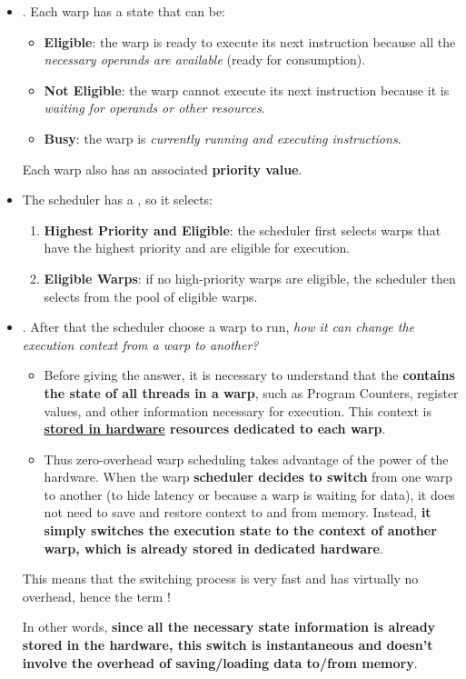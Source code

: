 \begin{itemize}
    \item {}. Each warp has a state that can be:
    \begin{itemize}
        \item \textbf{Eligible}: the warp is ready to execute its next instruction because all the \emph{necessary operands are available} (ready for consumption).
        \item \textbf{Not Eligible}: the warp cannot execute its next instruction because it is \emph{waiting for operands or other resources}.
        \item \textbf{Busy}: the warp is \emph{currently running and executing instructions}.
    \end{itemize}
    Each warp also has an associated \textbf{priority value}.

    \item The scheduler has a , so it selects:
    \begin{enumerate}
        \item \textbf{Highest Priority and Eligible}: the scheduler first selects warps that have the highest priority and are eligible for execution.
        \item \textbf{Eligible Warps}: if no high-priority warps are eligible, the scheduler then selects from the pool of eligible warps.
    \end{enumerate}

    \item {}. After that the scheduler choose a warp to run, \emph{how it can change the execution context from a warp to another?}
    \begin{itemize}
        \item Before giving the answer, it is necessary to understand that the  \textbf{contains the state of all threads in a warp}, such as Program Counters, register values, and other information necessary for execution. This context is \textbf{\underline{stored in hardware} resources dedicated to each warp}.
        
        \item Thus zero-overhead warp scheduling takes advantage of the power of the hardware. When the warp \textbf{scheduler decides to switch} from one warp to another (to hide latency or because a warp is waiting for data), it does not need to save and restore context to and from memory. Instead, \textbf{it simply switches the execution state to the context of another warp, which is already stored in dedicated hardware}.
    \end{itemize}
    This means that the switching process is very fast and has virtually no overhead, hence the term !

    In other words, \textbf{since all the necessary state information is already stored in the hardware, this switch is instantaneous and doesn't involve the overhead of saving/loading data to/from memory}.
\end{itemize}

